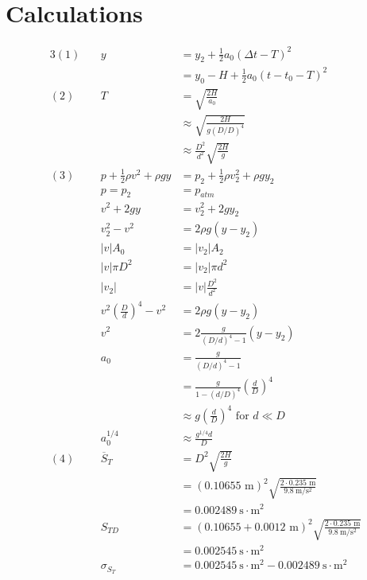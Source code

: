 \documentclass[12pt]{article}
\begin{document}
    \section{Calculations}
        \begin{alignat*}{3}
            (1)~&&
            y&=y_2 + \frac{1}{2}a_0(\Delta t - T)^2\\
            &&&= y_0 - H + \frac{1}{2}a_0(t-t_0 - T)^2\\
            (2)~&&
            T&=\sqrt{\frac{2H}{a_0}}\\
            &&&\approx \sqrt{\frac{2H}{g(D/D)^4}}\\
            &&&\approx \frac{D^2}{d^2}\sqrt{\frac{2H}{g}}\\
            (3)~&&
            p+\frac{1}{2} \rho v^2 + \rho g y &= p_2 + \frac{1}{2} \rho v_2^2 + \rho g y_2\\
            &&p = p_2 &= p_{atm}\\
            &&v^2 + 2g y &= v_2^2+ 2 g y_2\\
            &&v_2^2-v^2 &= 2\rho g (y-y_2)\\
            &&|v|A_0 &= |v_2|A_2\\
            &&|v|\pi D^2 &= |v_2|\pi d^2\\
            &&|v_2| &= |v|\frac{D^2}{d^2}\\
            &&v^2\left( \frac{D}{d} \right)^4-v^2 &= 2\rho g (y-y_2)\\
            && v^2 &= 2\frac{g}{(D/d)^4-1}(y-y_2)\\
            &&a_0 &= \frac{g}{(D/d)^4-1}\\
            &&&=\frac{g}{1-(d/D)^4}\left(\frac{d}{D}\right)^4\\
            &&&\approx g\left(\frac{d}{D}\right)^4 \text{ for } d\ll D\\
            &&a_0^{1/4} & \approx \frac{g^{1/4}d}{D}\\
            (4)~&&
            \overline{S}_T&=D^2\sqrt{\frac{2H}{g}}\\
            &&&=(0.10655 \text{ m})^2\sqrt{\frac{2\cdot 0.235 \text{ m}}{9.8 \mathrm{~m/s^2}}}\\
            &&& = 0.002489\mathrm{~s \cdot m^2}\\
            &&S_{TD} &= (0.10655 + 0.0012\text{ m})^2\sqrt{\frac{2\cdot 0.235 \text{ m}}{9.8 \mathrm{~m/s^2}}}\\ 
            &&& = 0.002545\mathrm{~s \cdot m^2}\\
            &&\sigma_{S_T} &= 0.002545 \mathrm{~s \cdot m^2} -0.002489 \mathrm{~s \cdot m^2}\\

\end{alignat*}
\end{document}
